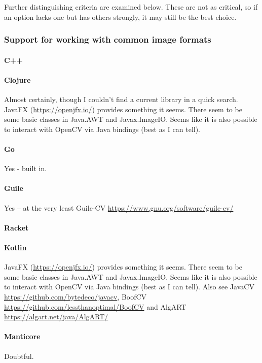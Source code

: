 Further distinguishing criteria are examined below.  These are not as critical, so if an option lacks one but has others strongly, it may still be the best choice.

\subsubsection{Support for working with common image formats}

\paragraph{C++}

\paragraph{Clojure}
Almost certainly, though I couldn't find a current library in a quick search.  JavaFX (\url{https://openjfx.io/}) provides something it seems.  There seem to be some basic classes in Java.AWT and Javax.ImageIO.  Seems like it is also possible to interact with OpenCV via Java bindings (best as I can tell).

\paragraph{Go}
Yes - built in.

\paragraph{Guile}
Yes -- at the very least Guile-CV \url{https://www.gnu.org/software/guile-cv/}

\paragraph{Racket}

\paragraph{Kotlin}
JavaFX (\url{https://openjfx.io/}) provides something it seems.  There seem to be some basic classes in Java.AWT and Javax.ImageIO.  Seems like it is also possible to interact with OpenCV via Java bindings (best as I can tell).  Also see JavaCV \url{https://github.com/bytedeco/javacv}, BoofCV \url{https://github.com/lessthanoptimal/BoofCV} and AlgART \url{https://algart.net/java/AlgART/}

\paragraph{Manticore}
Doubtful.

